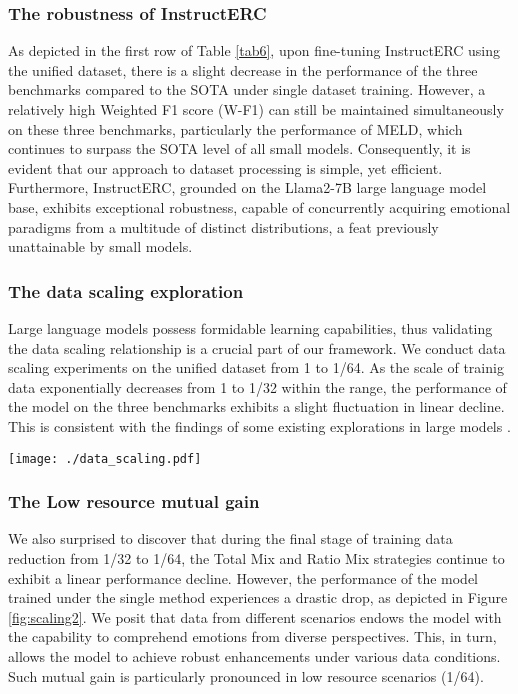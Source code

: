 \documentclass[conference]{IEEEtran}
\begin{document}
\subsubsection{The robustness of InstructERC} 


As depicted in the first row of Table \ref{tab6}, upon fine-tuning InstructERC using the unified dataset, there is a slight decrease in the performance of the three benchmarks compared to the SOTA under single dataset training.
However, a relatively high Weighted F1 score (W-F1) can still be maintained simultaneously on these three benchmarks, particularly the performance of MELD, which continues to surpass the SOTA level of all small models.
Consequently, it is evident that our approach to dataset processing is simple, yet efficient.
Furthermore, InstructERC, grounded on the Llama2-7B large language model base, exhibits exceptional robustness, capable of concurrently acquiring emotional paradigms from a multitude of distinct distributions, a feat previously unattainable by small models.


\subsubsection{The data scaling exploration}

Large language models possess formidable learning capabilities, thus validating the data scaling relationship is a crucial part of our framework.
We conduct data scaling experiments on the unified dataset from 1 to 1/64.
As the scale of trainig data exponentially decreases from 1 to 1/32 within the range, the performance of the model on the three benchmarks exhibits a slight fluctuation in linear decline. This is consistent with the findings of some existing explorations in large models \cite{dong2023abilities}.
\begin{figure*}
    \centering
    \texttt{[image: ./data\_scaling.pdf]}
    \caption{The data scaling law demonstrated on three benchmarks using different data mixing strategies}
    \label{fig:scaling2}
\end{figure*}

\subsubsection{The Low resource mutual gain} 

We also surprised to discover that during the final stage of training data reduction from 1/32 to 1/64, the Total Mix and Ratio Mix strategies continue to exhibit a linear performance decline.
However, the performance of the model trained under the single method experiences a drastic drop, as depicted in Figure \ref{fig:scaling2}.
We posit that data from different scenarios endows the model with the capability to comprehend emotions from diverse perspectives.
This, in turn, allows the model to achieve robust enhancements under various data conditions.
Such mutual gain is particularly pronounced in low resource scenarios (1/64).
\end{document}
